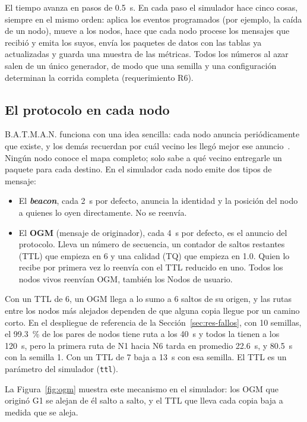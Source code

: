 El tiempo avanza en pasos de 0.5~s. En cada paso el simulador hace cinco cosas,
siempre en el mismo orden: aplica los eventos programados (por ejemplo, la caída
de un nodo), mueve a los nodos, hace que cada nodo procese los mensajes que
recibió y emita los suyos, envía los paquetes de datos con las tablas ya
actualizadas y guarda una muestra de las métricas. Todos los números al azar
salen de un único generador, de modo que una semilla y una configuración
determinan la corrida completa (requerimiento R6).

\subsection{El protocolo en cada nodo}
\label{sec:protocolo}

B.A.T.M.A.N. funciona con una idea sencilla: cada nodo anuncia periódicamente
que existe, y los demás recuerdan por cuál vecino les llegó mejor ese
anuncio~\cite{Neumann2008Batman}. Ningún nodo conoce el mapa completo; solo sabe
a qué vecino entregarle un paquete para cada destino. En el simulador cada nodo
emite dos tipos de mensaje:

\begin{itemize}
\item El \textbf{\textit{beacon}}, cada 2~s por defecto, anuncia la identidad y
la posición del nodo a quienes lo oyen directamente. No se reenvía.
\item El \textbf{OGM} (mensaje de originador), cada 4~s por defecto, es el
anuncio del protocolo. Lleva un número de secuencia, un contador de saltos
restantes (TTL) que empieza en 6 y una calidad (TQ) que empieza en 1.0. Quien lo
recibe por primera vez lo reenvía con el TTL reducido en uno. Todos los nodos
vivos reenvían OGM, también los Nodos de usuario.
\end{itemize}

Con un TTL de 6, un OGM llega a lo sumo a 6 saltos de su origen, y las rutas
entre los nodos más alejados dependen de que alguna copia llegue por un camino
corto. En el despliegue de referencia de la Sección~\ref{sec:res-fallos},
con 10 semillas, el 99.3~\% de los pares de nodos tiene ruta a los 40~s y todos
la tienen a los 120~s, pero la primera ruta de N1 hacia N6 tarda en promedio
22.6~s, y 80.5~s con la semilla 1. Con un TTL de 7 baja a 13~s con esa semilla.
El TTL es un parámetro del simulador (\texttt{ttl}).

La Figura~\ref{fig:ogm} muestra este mecanismo en el simulador: los OGM que
originó G1 se alejan de él salto a salto, y el TTL que lleva cada copia baja a
medida que se aleja.

